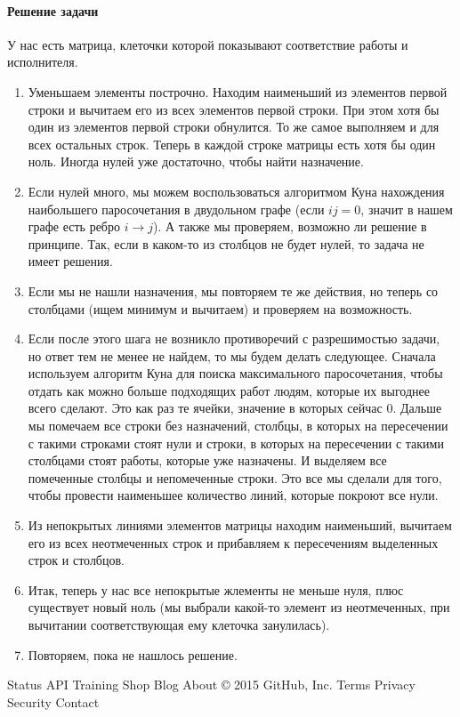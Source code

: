 \paragraph{Решение задачи}
У нас есть матрица, клеточки которой показывают соответствие работы и исполнителя.
\begin{enumerate}
	\item Уменьшаем элементы построчно. Находим наименьший из элементов первой строки и вычитаем его из всех элементов первой строки. При этом хотя бы один из элементов первой строки обнулится. 
	То же самое выполняем и для всех остальных строк. Теперь в каждой строке матрицы есть хотя бы один ноль. Иногда нулей уже достаточно, чтобы найти назначение.
    \item Если нулей много, мы можем воспользоваться алгоритмом Куна нахождения наибольшего паросочетания в двудольном графе (если $ij = 0$, значит в нашем графе есть ребро $i \to j$). А также мы проверяем,
    возможно ли решение в принципе. Так, если в каком-то из столбцов не будет нулей, то задача не имеет решения.
    \item Если мы не нашли назначения, мы повторяем те же действия, но теперь со столбцами (ищем минимум и вычитаем) и проверяем на возможность.
    \item Если после этого шага не возникло противоречий с разрешимостью задачи, но ответ тем не менее не найдем, то мы будем делать следующее. Сначала используем алгоритм Куна для поиска максимального
    паросочетания, чтобы отдать как можно больше подходящих работ людям, которые их выгоднее всего сделают. Это как раз те ячейки, значение в которых сейчас 0. Дальше мы помечаем все строки без назначений,
    столбцы, в которых на пересечении с такими строками стоят нули и строки, в которых на пересечении с такими столбцами стоят работы, которые уже назначены. И выделяем все помеченные столбцы и непомеченные 
    строки. Это все мы сделали для того, чтобы провести наименьшее количество линий, которые покроют все нули.
    \item Из непокрытых линиями элементов матрицы находим наименьший, вычитаем его из всех неотмеченных строк и прибавляем к пересечениям выделенных строк и столбцов.
    \item Итак, теперь у нас все непокрытые жлементы не меньше нуля, плюс существует новый ноль (мы выбрали какой-то элемент из неотмеченных, при вычитании соответствующая ему клеточка занулилась).
    \item Повторяем, пока не нашлось решение.
\end{enumerate}
 

 
Status API Training Shop Blog About
© 2015 GitHub, Inc. Terms Privacy Security Contact
